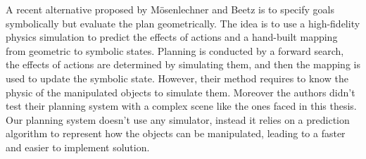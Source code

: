 A recent alternative proposed by Mösenlechner and Beetz \citep{Msenlechner2009UsingPA} is to specify goals symbolically but evaluate the plan geometrically.
The idea is to use a high-fidelity physics simulation to predict the effects of actions and a hand-built mapping from geometric to symbolic states. Planning is conducted by a forward search, the effects of actions are determined by simulating them, and then the mapping is used to update the symbolic state. However, their method requires to know the physic of the manipulated objects to simulate them. Moreover the authors didn't test their planning system with a complex scene like the ones faced in this thesis.
Our planning system doesn't use any simulator, instead it relies on a prediction algorithm to represent how the objects can be manipulated, leading to a faster and easier to implement solution. 




